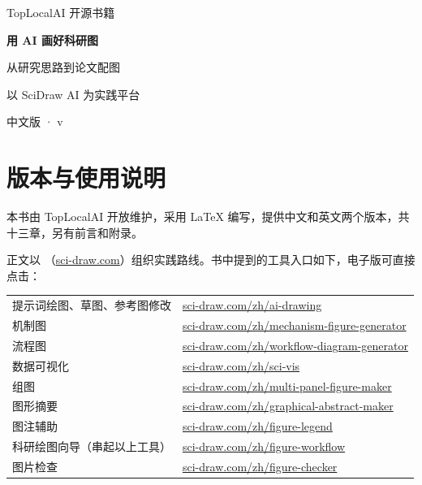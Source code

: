 \documentclass[UTF8,openany,fontset=fandol,zihao=-4]{ctexbook}
\begin{document}

\begin{titlepage}
\color{BookInk}
\vspace*{18mm}
{\sffamily\large TopLocalAI 开源书籍\par}
\vspace{18mm}
{\Huge\bfseries 用 AI 画好科研图\par}
\vspace{8mm}
{\Large 从研究思路到论文配图\par}
\vspace{14mm}
{\large 以 SciDraw AI 为实践平台\par}
\vfill
{\large 中文版 · v\bookversion\par}
\vspace{3mm}
{\normalsize \bookdate\par}
\vspace{8mm}
\end{titlepage}
\frontmatter
\chapter*{版本与使用说明}
本书由 TopLocalAI 开放维护，采用 LaTeX 编写，提供中文和英文两个版本，共十三章，另有前言和附录。

正文以 \scidraw{}（\href{https://sci-draw.com/zh}{sci-draw.com}）组织实践路线。书中提到的工具入口如下，电子版可直接点击：

\begin{center}\small
\begin{tabular}{@{}ll@{}}
提示词绘图、草图、参考图修改 & \href{https://sci-draw.com/zh/ai-drawing}{sci-draw.com/zh/ai-drawing}\\
机制图 & \href{https://sci-draw.com/zh/mechanism-figure-generator}{sci-draw.com/zh/mechanism-figure-generator}\\
流程图 & \href{https://sci-draw.com/zh/workflow-diagram-generator}{sci-draw.com/zh/workflow-diagram-generator}\\
数据可视化 & \href{https://sci-draw.com/zh/sci-vis}{sci-draw.com/zh/sci-vis}\\
组图 & \href{https://sci-draw.com/zh/multi-panel-figure-maker}{sci-draw.com/zh/multi-panel-figure-maker}\\
图形摘要 & \href{https://sci-draw.com/zh/graphical-abstract-maker}{sci-draw.com/zh/graphical-abstract-maker}\\
图注辅助 & \href{https://sci-draw.com/zh/figure-legend}{sci-draw.com/zh/figure-legend}\\
科研绘图向导（串起以上工具） & \href{https://sci-draw.com/zh/figure-workflow}{sci-draw.com/zh/figure-workflow}\\
图片检查 & \href{https://sci-draw.com/zh/figure-checker}{sci-draw.com/zh/figure-checker}\\
\end{tabular}
\end{center}
\end{document}
